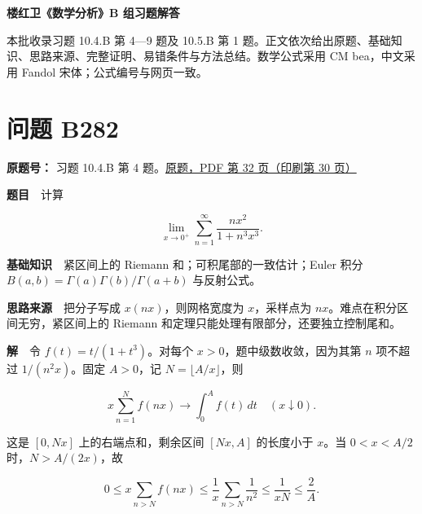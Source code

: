 \documentclass[11pt,a4paper]{article}
\begin{document}
\begin{center}
{\Large\bfseries 楼红卫《数学分析》B 组习题解答\par}
\vspace{7pt}{\large 第四十一批\quad B282—B288\par}
\vspace{5pt}{Euler 积分、特殊函数与变分反例\par}
\end{center}
本批收录习题 10.4.B 第 4—9 题及 10.5.B 第 1 题。正文依次给出原题、基础知识、思路来源、完整证明、易错条件与方法总结。数学公式采用 CM bea，中文采用 Fandol 宋体；公式编号与网页一致。
\begingroup\setlength{\parskip}{0pt}\tableofcontents\endgroup

\section{问题 B282}\label{ux95eeux9898-b282}

\textbf{原题号：} 习题 10.4.B 第 4
题。\href{https://zj139.github.io/math-notes/files/problems/楼分析习题-v2.pdf\#page=32}{原题，PDF
第 32 页（印刷第 30 页）}

\textbf{题目}　计算

\begin{equation}
\lim_{x\to0^+}\sum_{n=1}^{\infty}\frac{nx^2}{1+n^3x^3}.
\tag{1}
\end{equation}

\textbf{基础知识}　紧区间上的 Riemann 和；可积尾部的一致估计；Euler 积分
\(B(a,b)=\Gamma(a)\Gamma(b)/\Gamma(a+b)\) 与反射公式。

\textbf{思路来源}　把分子写成 \(x(nx)\)，则网格宽度为 \(x\)，采样点为
\(nx\)。难点在积分区间无穷，紧区间上的 Riemann
和定理只能处理有限部分，还要独立控制尾和。

\textbf{解}　令 \(f(t)=t/(1+t^3)\)。对每个
\(x>0\)，题中级数收敛，因为其第 \(n\) 项不超过 \(1/(n^2x)\)。固定
\(A>0\)，记 \(N=\lfloor A/x\rfloor\)，则

\begin{equation}
x\sum_{n=1}^{N}f(nx)\longrightarrow\int_0^A f(t)\,dt
\quad(x\downarrow0).
\tag{2}
\end{equation}

这是 \([0,Nx]\) 上的右端点和，剩余区间 \([Nx,A]\) 的长度小于 \(x\)。当
\(0<x<A/2\) 时，\(N>A/(2x)\)，故

\begin{equation}
0\le x\sum_{n>N}f(nx)
\le\frac1x\sum_{n>N}\frac1{n^2}
\le\frac1{xN}\le\frac2A.
\tag{3}
\end{equation}
\end{document}

